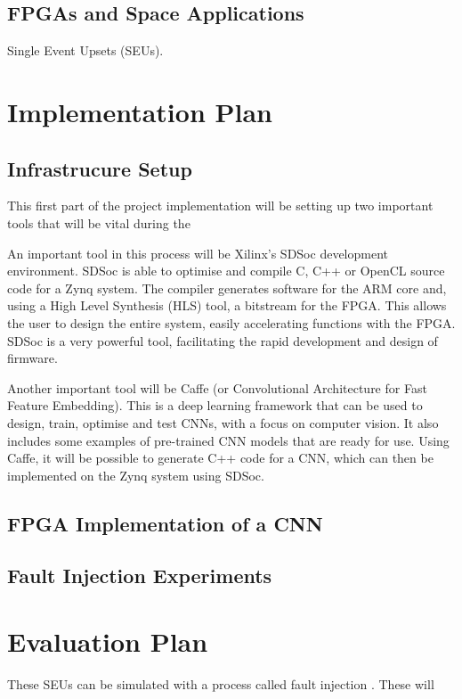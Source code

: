 \documentclass[11pt]{article}
\begin{document}
\subsection{FPGAs and Space Applications}
\label{sec:Background-FPGAsAndSpaceApplications}

Single Event Upsets (SEUs).

\section{Implementation Plan}
\label{sec:ImpPlan}

\subsection{Infrastrucure Setup}
\label{sec:ImpPlan-InfSetup}

This first part of the project implementation will be setting up two important tools that will be vital during the 

An important tool in this process will be Xilinx's SDSoc development environment. SDSoc is able to optimise and compile C, C++ or OpenCL source code for a Zynq system. The compiler generates software for the ARM core and, using a High Level Synthesis (HLS) tool, a bitstream for the FPGA. This allows the user to design the entire system, easily accelerating functions with the FPGA. SDSoc is a very powerful tool, facilitating the rapid development and design of firmware.

Another important tool will be Caffe (or Convolutional Architecture for Fast Feature Embedding). This is a deep learning framework that can be used to design, train, optimise and test CNNs, with a focus on computer vision\cite{jia2014caffe}. It also includes some examples of pre-trained CNN models that are ready for use. Using Caffe, it will be possible to generate C++ code for a CNN, which can then be implemented on the Zynq system using SDSoc.

\subsection{FPGA Implementation of a CNN}
\label{sec:ImpPlan-FPGAImplOfCnn}

\subsection{Fault Injection Experiments}
\label{sec:ImpPlan-FaultInjExp}

\section{Evaluation Plan}
\label{sec:EvalPlan}


These SEUs can be simulated with a process called fault injection \cite{FaultInjection}. These will 



\nocite{*}
\end{document}
